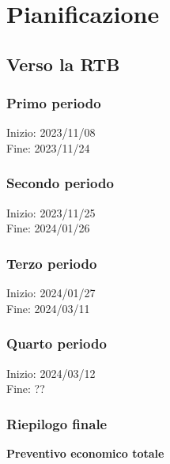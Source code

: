 \pagebreak
\section{Pianificazione}

\subsection{Verso la RTB}

\subsubsection{Primo periodo}
Inizio: 2023/11/08 \\
Fine: 2023/11/24 \\



\subsubsection{Secondo periodo}
Inizio: 2023/11/25 \\
Fine: 2024/01/26 \\



\subsubsection{Terzo periodo}
Inizio: 2024/01/27 \\
Fine: 2024/03/11 \\



\subsubsection{Quarto periodo}
Inizio: 2024/03/12 \\
Fine: ?? \\





\subsubsection{Riepilogo finale}
\textbf{Preventivo economico totale}

